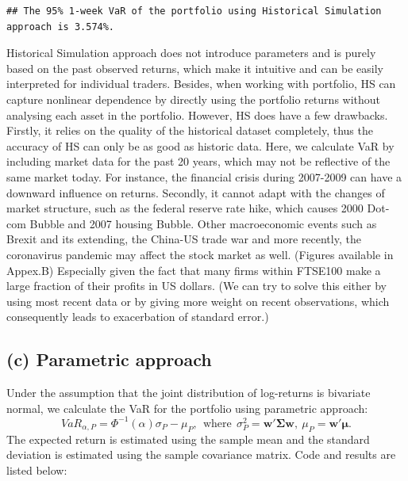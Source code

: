 \documentclass[]{article}
\newenvironment{Shaded}{\begin{snugshade}}{\end{snugshade}}
\newcommand{\DataTypeTok}[1]{\textcolor[rgb]{0.13,0.29,0.53}{#1}}
\newcommand{\FloatTok}[1]{\textcolor[rgb]{0.00,0.00,0.81}{#1}}
\newcommand{\KeywordTok}[1]{\textcolor[rgb]{0.13,0.29,0.53}{\textbf{#1}}}
\newcommand{\NormalTok}[1]{#1}
\newcommand{\StringTok}[1]{\textcolor[rgb]{0.31,0.60,0.02}{#1}}
\begin{document}
\begin{Shaded}
\end{Shaded}

\begin{verbatim}
## The 95% 1-week VaR of the portfolio using Historical Simulation approach is 3.574%.
\end{verbatim}

Historical Simulation approach does not introduce parameters and is
purely based on the past observed returns, which make it intuitive and
can be easily interpreted for individual traders. Besides, when working
with portfolio, HS can capture nonlinear dependence by directly using
the portfolio returns without analysing each asset in the portfolio.
However, HS does have a few drawbacks. Firstly, it relies on the quality
of the historical dataset completely, thus the accuracy of HS can only
be as good as historic data. Here, we calculate VaR by including market
data for the past 20 years, which may not be reflective of the same
market today. For instance, the financial crisis during 2007-2009 can
have a downward influence on returns. Secondly, it cannot adapt with the
changes of market structure, such as the federal reserve rate hike,
which causes 2000 Dot-com Bubble and 2007 housing Bubble. Other
macroeconomic events such as Brexit and its extending, the China-US
trade war and more recently, the coronavirus pandemic may affect the
stock market as well. (Figures available in Appex.B) Especially given
the fact that many firms within FTSE100 make a large fraction of their
profits in US dollars. (We can try to solve this either by using most
recent data or by giving more weight on recent observations, which
consequently leads to exacerbation of standard error.)

\hypertarget{c-parametric-approach}{%
\subsection{(c) Parametric approach}\label{c-parametric-approach}}

Under the assumption that the joint distribution of log-returns is
bivariate normal, we calculate the VaR for the portfolio using
parametric approach: \[
VaR_{\alpha,P} = \Phi^{-1}(\alpha)\sigma_P - \mu_P, \ \ \text{where} \ \ \sigma_P^2 = \mathbf{w' \Sigma w},\  \mu_P = \mathbf{w' \mu}. 
\] The expected return is estimated using the sample mean and the
standard deviation is estimated using the sample covariance matrix. Code
and results are listed below:
\end{document}
